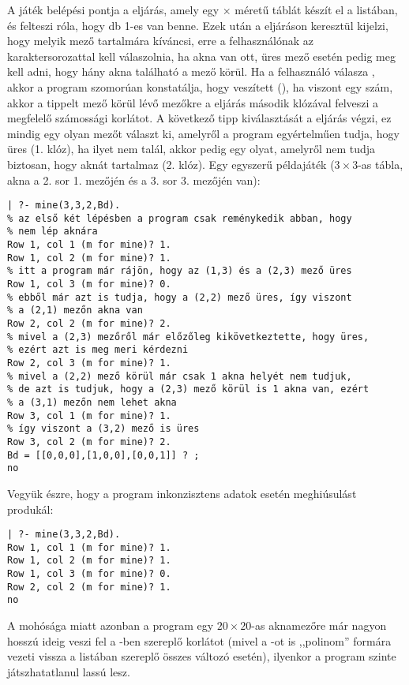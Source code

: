 A játék belépési pontja a  eljárás, amely
egy  $\times$  méretű táblát készít el a 
listában, és felteszi róla, hogy  db 1-es van benne.
Ezek után a  eljáráson keresztül kijelzi, hogy melyik
mező tartalmára kíváncsi, erre a felhasználónak az  karaktersorozattal
kell válaszolnia, ha akna van ott, üres mező esetén pedig meg kell adni, hogy
hány akna található a mező körül. Ha a felhasználó válasza , akkor a
program szomorúan konstatálja, hogy veszített (), ha viszont egy
szám, akkor a tippelt mező körül lévő mezőkre a  eljárás
második klózával felveszi a megfelelő számossági korlátot. A következő tipp
kiválasztását a  eljárás végzi, ez mindig egy olyan mezőt
választ ki, amelyről a program egyértelműen tudja, hogy üres (1. klóz), ha ilyet
nem talál, akkor pedig egy olyat, amelyről nem tudja biztosan, hogy aknát tartalmaz
(2. klóz). Egy egyszerű példajáték ($3 \times 3$-as tábla, akna a 2. sor 1. mezőjén
és a 3. sor 3. mezőjén van):

\begin{verbatim}
| ?- mine(3,3,2,Bd).
% az első két lépésben a program csak reménykedik abban, hogy
% nem lép aknára
Row 1, col 1 (m for mine)? 1.
Row 1, col 2 (m for mine)? 1.
% itt a program már rájön, hogy az (1,3) és a (2,3) mező üres
Row 1, col 3 (m for mine)? 0.
% ebből már azt is tudja, hogy a (2,2) mező üres, így viszont
% a (2,1) mezőn akna van
Row 2, col 2 (m for mine)? 2.
% mivel a (2,3) mezőről már előzőleg kikövetkeztette, hogy üres,
% ezért azt is meg meri kérdezni
Row 2, col 3 (m for mine)? 1.
% mivel a (2,2) mező körül már csak 1 akna helyét nem tudjuk,
% de azt is tudjuk, hogy a (2,3) mező körül is 1 akna van, ezért
% a (3,1) mezőn nem lehet akna
Row 3, col 1 (m for mine)? 1.
% így viszont a (3,2) mező is üres
Row 3, col 2 (m for mine)? 2.
Bd = [[0,0,0],[1,0,0],[0,0,1]] ? ;
no
\end{verbatim}

Vegyük észre, hogy a program inkonzisztens adatok esetén meghiúsulást produkál:

\begin{verbatim}
| ?- mine(3,3,2,Bd).
Row 1, col 1 (m for mine)? 1.
Row 1, col 2 (m for mine)? 1.
Row 1, col 3 (m for mine)? 0.
Row 2, col 2 (m for mine)? 1.
no
\end{verbatim}

A \clpb mohósága miatt azonban a program egy $20 \times 20$-as aknamezőre már
nagyon hosszú ideig veszi fel a -ben szereplő 
korlátot (mivel a -ot is ,,polinom'' formára vezeti vissza a listában
szereplő összes változó esetén), ilyenkor a program szinte játszhatatlanul lassú lesz.
